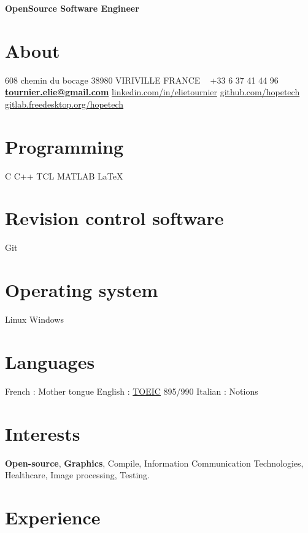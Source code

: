 \documentclass[]{Elie-cv}
\begin{document}
       {\textbf{\color{white}OpenSource Software Engineer}}

\begin{aside}
  \section{About}
    608 chemin du bocage
    38980 VIRIVILLE
    FRANCE
    ~
    +33 6 37 41 44 96
    ~
    \href{mailto:tournier.elie@gmail.com}{\textbf{tournier.elie@gmail.com}}
    \href{https://fr.linkedin.com/in/elietournier}{linkedin.com/in/elietournier}
    \href{https://github.com/Hopetech}{github.com/hopetech}
     \href{https://gitlab.freedesktop.org/hopetech}{gitlab.freedesktop.org/hopetech}
  \section{Programming}
    C
    C++
    TCL
    MATLAB
    \LaTeX{} 
  \section{Revision control software}
    Git
  \section{Operating system}
    Linux
    Windows
  \section{Languages}
    French : Mother tongue
    English : \href{http://www.ets.org/toeic}{TOEIC} 895/990
    Italian : Notions   
\end{aside}

\section{Interests}

\textbf{Open-source}, \textbf{Graphics}, Compile, Information Communication Technologies, Healthcare, Image processing, Testing.

\section{Experience}
\end{document}
